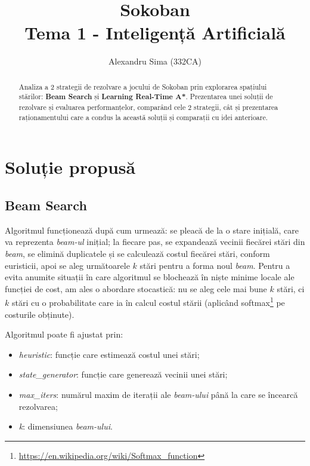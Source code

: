 \documentclass{article}
\title{Sokoban\\Tema 1 - Inteligență Artificială}
\author{Alexandru Sima (332CA)}
\begin{document}
\maketitle
\begin{abstract}
    Analiza a 2 strategii de rezolvare a jocului de Sokoban prin explorarea 
    spațiului stărilor: \textbf{Beam Search} și \textbf{Learning Real-Time A*}. 
    Prezentarea unei soluții de rezolvare și evaluarea performanțelor, comparând
    cele 2 strategii, cât și prezentarea raționamentului care a condus la 
    această soluții și comparații cu idei anterioare.
\end{abstract}

\pagestyle{fancy}

\newpage
\tableofcontents

\newpage
\section{Soluție propusă}

\subsection{Beam Search}
Algoritmul funcționează după cum urmează: se pleacă de la o stare inițială,
care va reprezenta \textit{beam-ul} inițial; la fiecare pas, se expandează 
vecinii fiecărei stări din \textit{beam}, se elimină duplicatele și se 
calculează costul fiecărei stări, conform euristicii, apoi se aleg următoarele 
$k$ stări pentru a forma noul \textit{beam}. Pentru a evita anumite situații
în care algoritmul se blochează în niște minime locale ale funcției de cost, 
am ales o abordare stocastică: nu se aleg cele mai bune $k$ stări, ci $k$ stări 
cu o probabilitate care ia în calcul costul stării (aplicând 
softmax\footnote{\url{https://en.wikipedia.org/wiki/Softmax_function}} pe 
costurile obținute).

Algoritmul poate fi ajustat prin:
\begin{itemize}
    \item \textit{heuristic}: funcție care estimează costul unei stări;
    \item \textit{state\_generator}: funcție care generează vecinii unei stări;
    \item \textit{max\_iters}: numărul maxim de iterații ale \textit{beam-ului}
    până la care se încearcă rezolvarea;
    \item \textit{k}: dimensiunea \textit{beam-ului}.    
\end{itemize}
\end{document}
